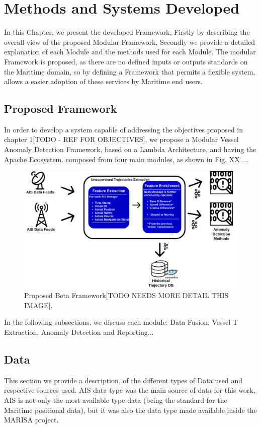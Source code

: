 \chapter{Methods and Systems Developed}
\label{chapter:Chapter 3}

In this Chapter, we present the developed Framework, Firstly by describing the overall view of the proposed Modular Framework, Secondly we provide a detailed explanation of each Module and the methods used for each Module. The modular Framework is proposed, as there are no defined inputs or outputs standards on the Maritime domain, so by defining a Framework that permits a flexible system, allows a easier adoption of these services by Maritime end users. 

\section{Proposed Framework}
In order to develop a system capable of addressing the objectives proposed in chapter 1[TODO - REF FOR OBJECTIVES], we propose a Modular Vessel Anomaly Detection Framework, based on a Lambda Architecture, and having the Apache Ecosystem. composed from four main modules, as shown in Fig. XX ...

\begin{figure}[H]
	\centering
	\includegraphics[scale = .25]{figures/UTE.png}
    \caption{Proposed Beta Framework[TODO NEEDS MORE DETAIL THIS IMAGE].}
    \label{fig: Framework}
\end{figure}

In the following subsections, we discuss each module: Data Fusion, Vessel T Extraction, Anomaly Detection and Reporting...

\section{Data}
This section we provide a description, of the different types of Data used and respective sources used. AIS data type was the main source of data for this work, AIS is not-only the most available type data (being the standard for the Maritime positional data), but it was also the data type made available inside the MARISA project.

